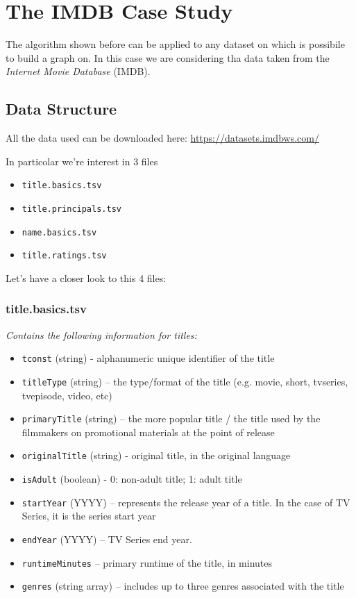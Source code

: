 \section{The IMDB Case Study}
The algorithm shown before can be applied to any dataset on which is possibile to build a graph on. In this case we are considering tha data taken from the \emph{Internet Movie Database} (IMDB).

\subsection{Data Structure}
All the data used can be downloaded here: \url{https://datasets.imdbws.com/} \s

\noindent In particolar we're interest in 3 files
\begin{itemize}
    \item \texttt{title.basics.tsv}
    \item \texttt{title.principals.tsv}
    \item \texttt{name.basics.tsv}
    \item \texttt{title.ratings.tsv}
\end{itemize}
Let's have a closer look to this 4 files:

\subsubsection*{title.basics.tsv}
\emph{Contains the following information for titles:}
\begin{itemize}
    \item \texttt{tconst} (string) - alphanumeric unique identifier of the title
    \item \texttt{titleType} (string) – the type/format of the title (e.g. movie, short, tvseries, tvepisode, video, etc)
    \item \texttt{primaryTitle} (string) – the more popular title / the title used by the filmmakers on promotional materials at the point of release
    \item \texttt{originalTitle} (string) - original title, in the original language
    \item \texttt{isAdult} (boolean) - 0: non-adult title; 1: adult title
    \item \texttt{startYear} (YYYY) – represents the release year of a title. In the case of TV Series, it is the series start year
    \item \texttt{endYear} (YYYY) – TV Series end year.
    \item \texttt{runtimeMinutes} – primary runtime of the title, in minutes
    \item \texttt{genres} (string array) – includes up to three genres associated with the title
\end{itemize}

